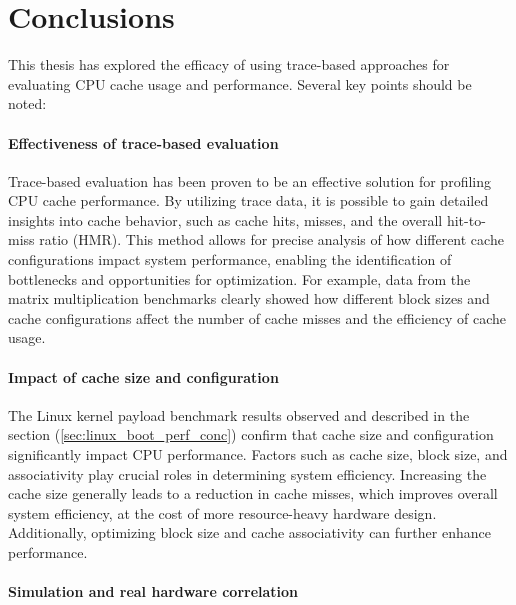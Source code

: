 
\chapter{Conclusions}

This thesis has explored the efficacy of using trace-based approaches for evaluating CPU cache usage and performance. Several key points should be noted:

\subsubsection*{Effectiveness of trace-based evaluation}

Trace-based evaluation has been proven to be an effective solution for profiling CPU cache performance.
By utilizing trace data, it is possible to gain detailed insights into cache behavior, such as cache hits, misses, and the overall hit-to-miss ratio (HMR). This method allows
for precise analysis of how different cache configurations impact system performance, enabling the identification of bottlenecks and opportunities for optimization.
For example, data from the matrix multiplication benchmarks clearly showed how different block sizes and cache configurations affect the number of cache misses and the
efficiency of cache usage.

\subsubsection*{Impact of cache size and configuration}

The Linux kernel payload benchmark results observed and described in the section (\ref{sec:linux_boot_perf_conc}) confirm that cache size and configuration significantly impact CPU
performance. Factors such as cache size, block size, and associativity play crucial roles in determining system efficiency. Increasing the cache size generally leads to a reduction
in cache misses, which improves overall system efficiency, at the cost of more resource-heavy hardware design. Additionally, optimizing block size and cache associativity can
further enhance performance.


\subsubsection*{Simulation and real hardware correlation}

